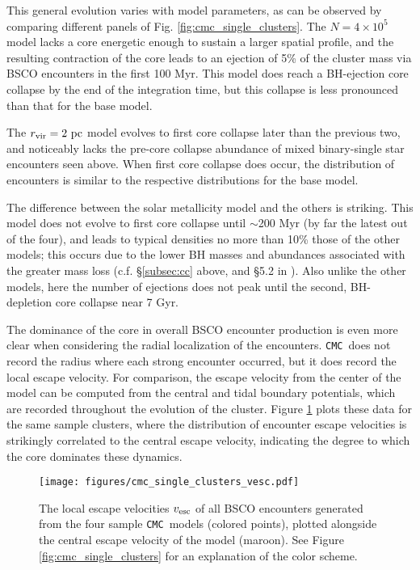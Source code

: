 \documentclass[twocolumn,linenumbers]{aastex631}
\newcommand{\CMC}{\texttt{CMC}}
\begin{document}
This general evolution varies with model parameters, as can be observed by comparing different panels of Fig. \ref{fig:cmc_single_clusters}.
The $N = 4 \times 10^5$ model lacks a core energetic enough to sustain a larger spatial profile, and the resulting contraction of the core leads to an ejection of 5\% of the cluster mass via BSCO encounters in the first 100 Myr.
This model does reach a BH-ejection core collapse by the end of the integration time, but this collapse is less pronounced than that for the base model.

The $r_{\rm vir} = 2~{\rm pc}$ model evolves to first core collapse later than the previous two, and noticeably lacks the pre-core collapse abundance of mixed binary-single star encounters seen above.
When first core collapse does occur, the distribution of encounters is similar to the respective distributions for the base model.

The difference between the solar metallicity model and the others is striking.
This model does not evolve to first core collapse until $\sim$200 Myr (by far the latest out of the four), and leads to typical densities no more than 10\% those of the other models; this occurs due to the lower BH masses and abundances associated with the greater mass loss (c.f. \S\ref{subsec:cc} above, and \S5.2 in \citet{2022arXiv220316547R}).
Also unlike the other models, here the number of ejections does not peak until the second, BH-depletion core collapse near 7 Gyr.

The dominance of the core in overall BSCO encounter production is even more clear when considering the radial localization of the encounters.
\CMC\ does not record the radius where each strong encounter occurred, but it does record the local escape velocity.
For comparison, the escape velocity from the center of the model can be computed from the central and tidal boundary potentials, which are recorded throughout the evolution of the cluster.
Figure \ref{fig:cmc_single_clusters_vesc} plots these data for the same sample clusters, where the distribution of encounter escape velocities is strikingly correlated to the central escape velocity, indicating the degree to which the core dominates these dynamics.

\begin{figure}
    \centering
    \texttt{[image: figures/cmc\_single\_clusters\_vesc.pdf]}
    \caption{
        The local escape velocities $v_{\rm esc}$ of all BSCO encounters generated from the four sample \CMC\ models (colored points), plotted alongside the central escape velocity of the model (maroon).
        See Figure \ref{fig:cmc_single_clusters} for an explanation of the color scheme.
    }
    \label{fig:cmc_single_clusters_vesc}
\end{figure}
\end{document}
